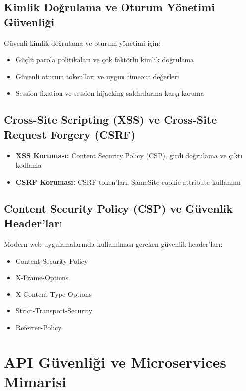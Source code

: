 \subsection{Kimlik Doğrulama ve Oturum Yönetimi Güvenliği}

Güvenli kimlik doğrulama ve oturum yönetimi için:

\begin{itemize}
\item Güçlü parola politikaları ve çok faktörlü kimlik doğrulama
\item Güvenli oturum token'ları ve uygun timeout değerleri
\item Session fixation ve session hijacking saldırılarına karşı koruma
\end{itemize}

\subsection{Cross-Site Scripting (XSS) ve Cross-Site Request Forgery (CSRF)}

\begin{itemize}
\item \textbf{XSS Koruması:} Content Security Policy (CSP), girdi doğrulama ve çıktı kodlama
\item \textbf{CSRF Koruması:} CSRF token'ları, SameSite cookie attribute kullanımı
\end{itemize}

\subsection{Content Security Policy (CSP) ve Güvenlik Header'ları}

Modern web uygulamalarında kullanılması gereken güvenlik header'ları:

\begin{itemize}
\item Content-Security-Policy
\item X-Frame-Options  
\item X-Content-Type-Options
\item Strict-Transport-Security
\item Referrer-Policy
\end{itemize}

\section{API Güvenliği ve Microservices Mimarisi}

